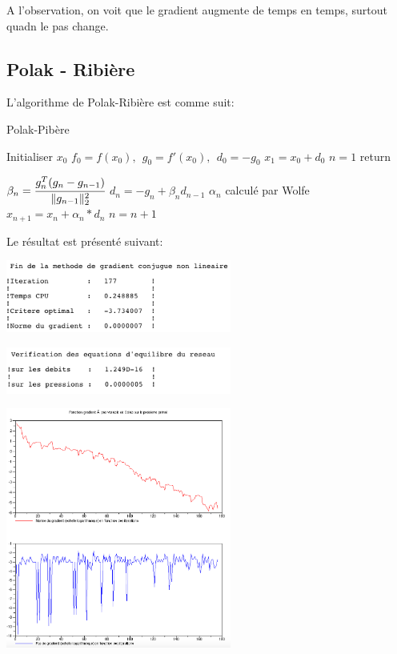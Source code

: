 A l'observation, on voit que le gradient augmente de temps en temps, surtout quadn le pas change.

\subsection{Polak - Ribière}

L'algorithme de Polak-Ribière est comme suit:

\begin{algorithm}
\caption{Polak-Pibère}
\begin{algorithmic}[1]
  \State Initialiser $x_0$
  \State $f_0 = f(x_0),\ \ g_0 = f'(x_0),\ \ d_0 = -g_0$
  \State $x_1 = x_0 + d_0$
  \State $n=1$
      return
    \EndIf

    \State $\beta_n = \cfrac{g_n^T (g_n - g_{n-1})}{\| g_{n-1} \|_2^2}$
    \State $d_n = -g_n + \beta_n d_{n-1}$
    \State $\alpha_n$ calculé par Wolfe
    \State $x_{n+1} = x_n + \alpha_n * d_n$
    \State $n = n+1$
  \EndWhile
\end{algorithmic}
\end{algorithm}

Le résultat est présenté suivant:

\begin{center}
  \includegraphics[width=20em]{conj.png}
  
  \includegraphics[width=20em]{conj_v.png}

  \includegraphics[width=20em]{conj_f.png}
\end{center}

